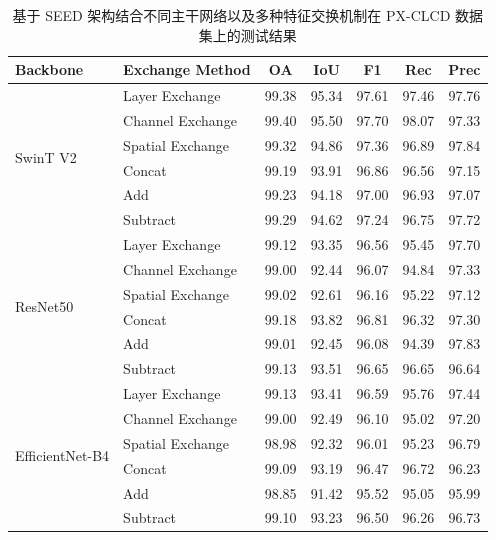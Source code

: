 \begin{table}[!htb]
\centering
\caption{基于 SEED 架构结合不同主干网络以及多种特征交换机制在 PX-CLCD 数据集上的测试结果}
\label{tab:seed_pxclcd_backbone}
\begin{tabular}{l l c c c c c}
\hline
\textbf{Backbone} & \textbf{Exchange Method} & \textbf{OA} & \textbf{IoU} & \textbf{F1} & \textbf{Rec} & \textbf{Prec} \\
\hline
\multirow{6}{*}{SwinT V2} 
 & Layer Exchange    & 99.38 & 95.34 & 97.61 & 97.46 & 97.76 \\
 & Channel Exchange  & 99.40 & 95.50 & 97.70 & 98.07 & 97.33 \\
 & Spatial Exchange  & 99.32 & 94.86 & 97.36 & 96.89 & 97.84 \\
\cline{2-7}
 & Concat            & 99.19 & 93.91 & 96.86 & 96.56 & 97.15 \\
 & Add               & 99.23 & 94.18 & 97.00 & 96.93 & 97.07 \\
 & Subtract             & 99.29 & 94.62 & 97.24 & 96.75 & 97.72 \\
\hline
\multirow{6}{*}{ResNet50} 
 & Layer Exchange    & 99.12 & 93.35 & 96.56 & 95.45 & 97.70 \\
 & Channel Exchange  & 99.00 & 92.44 & 96.07 & 94.84 & 97.33 \\
 & Spatial Exchange  & 99.02 & 92.61 & 96.16 & 95.22 & 97.12 \\
\cline{2-7}
 & Concat            & 99.18 & 93.82 & 96.81 & 96.32 & 97.30 \\
 & Add               & 99.01 & 92.45 & 96.08 & 94.39 & 97.83 \\ 
 & Subtract             & 99.13 & 93.51 & 96.65 & 96.65 & 96.64 \\
\hline
\multirow{6}{*}{EfficientNet-B4} 
 & Layer Exchange    & 99.13	& 93.41	& 96.59	& 95.76	& 97.44 \\
 & Channel Exchange  & 99.00 & 92.49 & 96.10 & 95.02 & 97.20 \\
 & Spatial Exchange  & 98.98	& 92.32	& 96.01	& 95.23	& 96.79 \\
\cline{2-7}
 & Concat            & 99.09	& 93.19	& 96.47	& 96.72	& 96.23 \\
 & Add               & 98.85 & 91.42 & 95.52 & 95.05 & 95.99 \\
 & Subtract          & 99.10	& 93.23	& 96.50	& 96.26	& 96.73 \\

\hline
\end{tabular}
\end{table}

